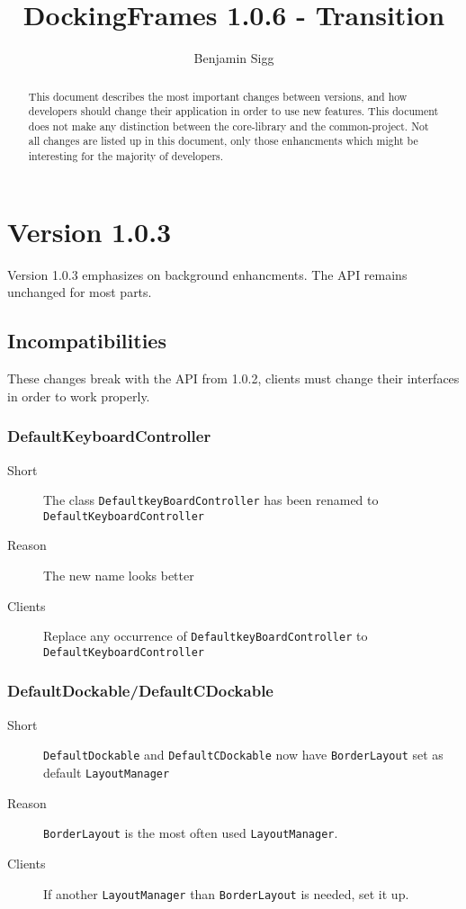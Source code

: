 \documentclass[a4paper,10pt]{article}
\title{DockingFrames 1.0.6 - Transition}
\author{Benjamin Sigg}
\newcommand{\src}[1]{\lstinline[basicstyle=\normalsize\ttfamily,keywordstyle=\normalsize\ttfamily,identifierstyle=\normalsize\ttfamily]|#1|}
\newcommand{\short}{\item[Short]}
\newcommand{\why}{\item[Reason]}
\newcommand{\clients}{\item[Clients]}
\begin{document}
\maketitle
\tableofcontents
\newpage


\begin{abstract}
This document describes the most important changes between versions, and how developers should change their application in order to use new features. This document does not make any distinction between the core-library and the common-project. Not all changes are listed up in this document, only those enhancments which might be interesting for the majority of developers.
\end{abstract}

\section{Version 1.0.3}
Version 1.0.3 emphasizes on background enhancments. The API remains unchanged for most parts.
\subsection{Incompatibilities}
These changes break with the API from 1.0.2, clients must change their interfaces in order to work properly.

\subsubsection{DefaultKeyboardController}
\begin{description}
\short The class \src{DefaultkeyBoardController} has been renamed to \\\src{DefaultKeyboardController} 
\why The new name looks better
\clients Replace any occurrence of \src{DefaultkeyBoardController} to \\\src{DefaultKeyboardController}
\end{description}

\subsubsection{DefaultDockable/DefaultCDockable}
\begin{description}
 \short \src{DefaultDockable} and \src{DefaultCDockable} now have \src{BorderLayout} set as default \src{LayoutManager}
 \why \src{BorderLayout} is the most often used \src{LayoutManager}.
 \clients If another \src{LayoutManager} than \src{BorderLayout} is needed, set it up.
\end{description}
\end{document}
